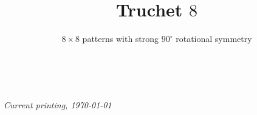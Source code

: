\documentclass{tufte-book}
\title{Truchet $8$}
\subtitle{$8\times 8$ patterns with strong $90^{\circ}$ rotational symmetry}
\author[]{}
\begin{document}



\maketitle


\newpage
\begin{fullwidth}
~\vfill
\thispagestyle{empty}
\setlength{\parindent}{0pt}
\setlength{\parskip}{\baselineskip}

\par\textit{Current printing, \today}
\end{fullwidth}

\cleardoublepage

\setlength{\tabcolsep}{0pt}
\renewcommand{\arraystretch}{0}


\backmatter
\nocite{*}


\end{document}
